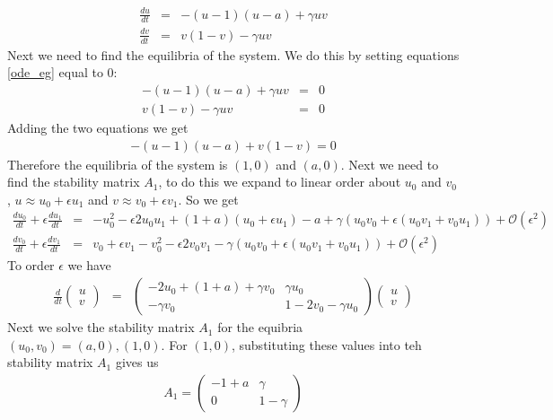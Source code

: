 \documentclass{mm2}
\numberwithin{equation}{section}
\theoremstyle{definition}
\begin{document}
\begin{eqnarray}
\frac{du}{dt} &=& -(u-1)(u - a) + \gamma uv \nonumber \\
\frac{dv}{dt} &=& v(1 - v) - \gamma uv
\label{ode_eg}
\end{eqnarray}
Next we need to find the equilibria of the system. We do this by setting equations \ref{ode_eg} equal to 0:
\begin{eqnarray}
 -(u-1)(u - a) + \gamma uv &=& 0 \nonumber \\
 v(1 - v) - \gamma uv &=& 0
\end{eqnarray}
Adding the two equations we get 
\begin{eqnarray}
-(u-1)(u-a) + v(1-v) = 0
\end{eqnarray}
Therefore the equilibria of the system is $(1,0)$ and $(a,0)$. Next we need to find the stability matrix $A_1$, to do this we expand to linear order about $u_0$ and $v_0$, $u \approx u_0 + \epsilon u_1$ and $v \approx v_0 + \epsilon v_1$. So we get 
\begin{eqnarray}
\frac{du_0}{dt} + \epsilon \frac{du_1}{dt} &=& -u_0^2 - \epsilon 2u_0 u_1 + (1+a)(u_0 + \epsilon u_1) - a + \gamma (u_0v_0 + \epsilon(u_0v_1 + v_0 u_1)) + \mathcal{O}(\epsilon^2) \nonumber \\
\frac{dv_0}{dt} + \epsilon \frac{dv_1}{dt} &=& v_0 + \epsilon v_1 -v_0^2 - \epsilon 2v_0v_1- \gamma (u_0v_0 + \epsilon(u_0v_1 + v_0 u_1)) + \mathcal{O}(\epsilon^2)
\end{eqnarray}
To order $\epsilon$ we have
\begin{eqnarray}
\frac{d}{dt} \begin{pmatrix}
u \\
v
\end{pmatrix}
&=& \begin{pmatrix}
-2u_0 + (1+a) + \gamma v_0  & \gamma u_0 \\
-\gamma v_0 & 1 - 2v_0 - \gamma u_0
\end{pmatrix}
\begin{pmatrix}
u \\
v
\end{pmatrix}
\end{eqnarray}
Next we solve the stability matrix $A_1$ for the equibria $(u_0, v_0) = (a, 0), (1, 0)$. For $(1,0)$, substituting these values into teh stability matrix $A_1$ gives us
\begin{eqnarray}
A_1 = \begin{pmatrix}
-1 + a & \gamma \\
0 & 1 - \gamma
\end{pmatrix}
\end{eqnarray} 
\end{document}
